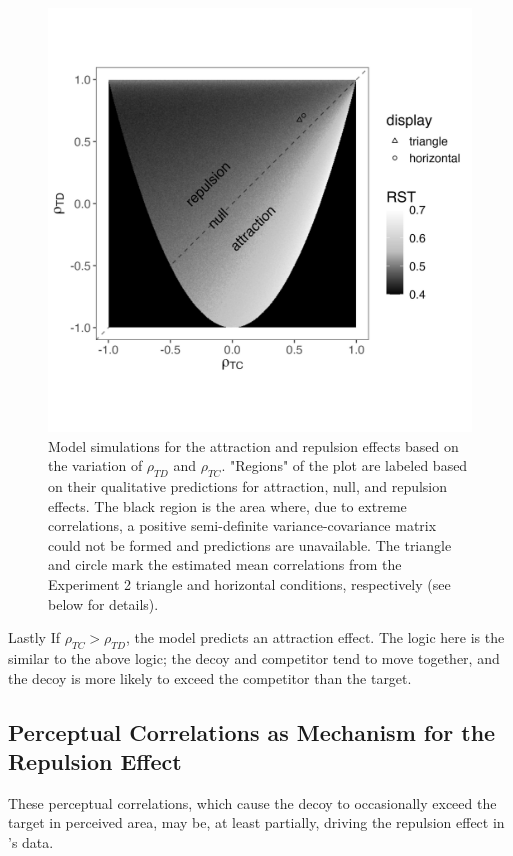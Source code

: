 \begin{figure}
   \includegraphics[width=\linewidth]{figures/3d_sim_rst.jpg}
   \caption{Model simulations for the attraction and repulsion effects based on the variation of $\rho_{TD}$ and $\rho_{TC}$. "Regions" of the plot are labeled based on their qualitative predictions for attraction, null, and repulsion effects. The black region is the area where, due to extreme correlations, a positive semi-definite variance-covariance matrix could not be formed and predictions are unavailable. The triangle and circle mark the estimated mean correlations from the Experiment 2 triangle and horizontal conditions, respectively (see below for details).}
   \label{fig:3d_model}
\end{figure}

Lastly If $\rho_{TC}>\rho_{TD}$, the model predicts an attraction effect. The logic here is the similar to the above logic; the decoy and competitor tend to move together, and the decoy is more likely to exceed the competitor than the target. 

\subsection{Perceptual Correlations as Mechanism for the Repulsion Effect}
These perceptual correlations, which cause the decoy to occasionally exceed the target in perceived area, may be, at least partially, driving the repulsion effect in \textcite{spektorWhenGoodLooks2018b}'s data. 

